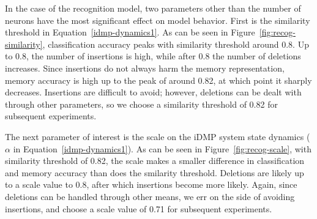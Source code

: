 In the case of the recognition model,
two parameters other than the number of neurons
have the most significant effect on model behavior.
First is the similarity threshold
in Equation~\eqref{idmp-dynamics1}.
As can be seen in Figure~\ref{fig:recog-similarity},
classification accuracy peaks with
similarity threshold around 0.8.
Up to 0.8, the number of insertions
is high, while after 0.8
the number of deletions increases.
Since insertions do not always harm
the memory representation,
memory accuracy is high
up to the peak of around 0.82,
at which point it sharply decreases.
Insertions are difficult to avoid;
however, deletions can be dealt
with through other parameters,
so we choose a similarity threshold of
0.82 for subsequent experiments.


The next parameter of interest is the
scale on the iDMP system state dynamics
($\alpha$ in Equation~\eqref{idmp-dynamics1}).
As can be seen in Figure~\ref{fig:recog-scale},
with similarity threshold of 0.82,
the scale makes a smaller difference
in classification and memory accuracy
than does the smilarity threshold.
Deletions are likely up to
a scale value to 0.8,
after which insertions become more likely.
Again, since deletions can be handled
through other means,
we err on the side of avoiding insertions,
and choose a scale value of 0.71
for subsequent experiments.


